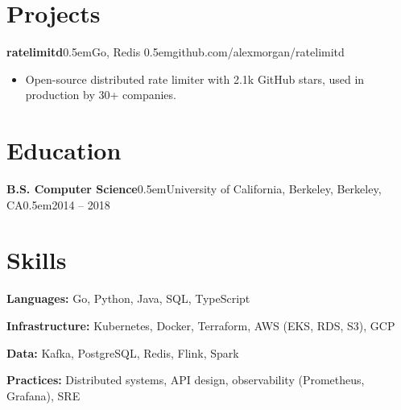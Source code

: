 \documentclass[11pt]{article}
\newcommand{\sep}{\unskip\kern0.5em\textbar\hspace{0.5em}}
\newcommand{\project}[2]{\textbf{#1}\sep #2\par}
\newcommand{\degree}[4]{\textbf{#1}\sep #3, #4\sep #2\par}
\begin{document}
\section{Projects}
\project{ratelimitd}{Go, Redis \sep github.com/alexmorgan/ratelimitd}
\begin{itemize}
  \item Open-source distributed rate limiter with 2.1k GitHub stars, used in production by 30+ companies.
\end{itemize}

\section{Education}
\degree{B.S. Computer Science}{2014 -- 2018}{University of California, Berkeley}{Berkeley, CA}

\section{Skills}
\textbf{Languages:} Go, Python, Java, SQL, TypeScript\par
\textbf{Infrastructure:} Kubernetes, Docker, Terraform, AWS (EKS, RDS, S3), GCP\par
\textbf{Data:} Kafka, PostgreSQL, Redis, Flink, Spark\par
\textbf{Practices:} Distributed systems, API design, observability (Prometheus, Grafana), SRE
\end{document}
